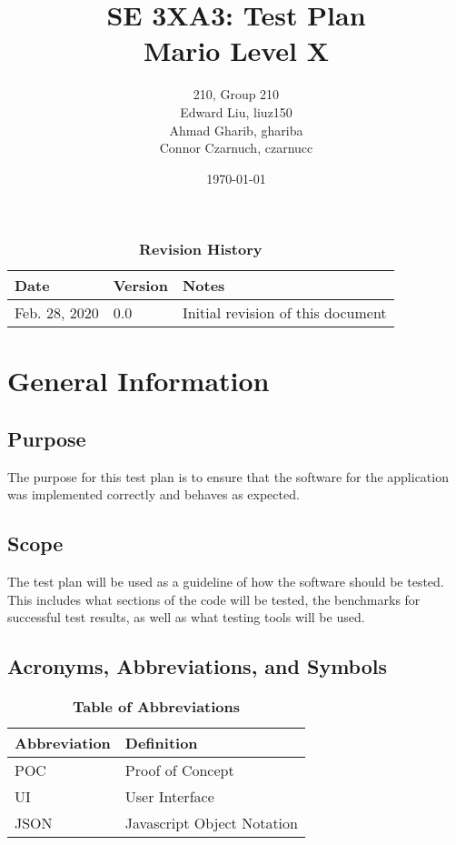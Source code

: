 \documentclass[12pt, titlepage]{article}
\title{SE 3XA3: Test Plan\\Mario Level X}
\author{210, Group 210
		\\ Edward Liu, liuz150
		\\ Ahmad Gharib, ghariba
		\\ Connor Czarnuch, czarnucc
}
\date{\today}
\begin{document}
\maketitle

\tableofcontents
\listoftables
\listoffigures

\begin{table}[bp]
\caption{\bf Revision History}
\begin{tabularx}{\textwidth}{p{3cm}p{2cm}X}
\toprule {\bf Date} & {\bf Version} & {\bf Notes}\\
\midrule
Feb. 28, 2020 & 0.0 & Initial revision of this document\\
\bottomrule
\end{tabularx}
\end{table}

\newpage


\section{General Information}

\subsection{Purpose}
The purpose for this test plan is to ensure that the software for the application was implemented correctly and behaves as expected.

\subsection{Scope}
The test plan will be used as a guideline of how the software should be tested. This includes what sections of the code will be tested, the benchmarks for successful test results, as well as what testing tools will be used.
\subsection{Acronyms, Abbreviations, and Symbols}

\begin{table}[hbp]
\caption{\textbf{Table of Abbreviations}} \label{Table}

\begin{tabularx}{\textwidth}{p{3cm}X}
\toprule
\textbf{Abbreviation} & \textbf{Definition} \\
\midrule
POC & Proof of Concept\\
UI & User Interface\\
JSON & Javascript Object Notation\\
\bottomrule
\end{tabularx}

\end{table}
\end{document}
